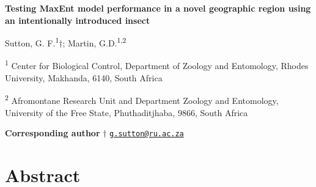 \documentclass[12pt,]{article}
\author{}
\date{}
\begin{document}
	
%    





\vskip -8.5pt



\noindent \doublespacing 

\pagebreak

\setlength{\parindent}{0in}
\setlength{\leftskip}{0in}
\setlength{\parskip}{8pt}
\vspace*{-0.2in}

\noindent

\textbf{Testing MaxEnt model performance in a novel geographic region
using an intentionally introduced insect}

Sutton, G. F.\textsuperscript{1}\(\dag\); Martin,
G.D.\textsuperscript{1,2}

\hfill\break

\begingroup
\fontsize{10}{12}\selectfont

\textsuperscript{1} Center for Biological Control, Department of Zoology
and Entomology, Rhodes University, Makhanda, 6140, South Africa

\textsuperscript{2} Afromontane Research Unit and Department Zoology and
Entomology, University of the Free State, Phuthaditjhaba, 9866, South
Africa \endgroup

\hfill\break

\textbf{Corresponding author} \(\dag\)
\href{mailto:g.sutton@ru.ac.za}{\nolinkurl{g.sutton@ru.ac.za}}

\pagebreak

\setlength\parindent{24pt}

\hypertarget{abstract}{%
\section{Abstract}\label{abstract}}
\end{document}
